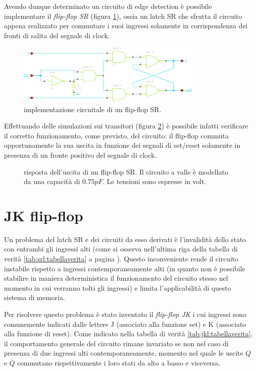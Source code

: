 	\vspace{3mm}
	Avendo dunque determinato un circuito di edge detection è possibile implementare il \textit{flip-flop SR} (figura \ref{fig:srl:flipflop}), ossia un latch SR che sfrutta il circuito appena realizzato per commutare i suoi ingressi solamente in corrispondenza dei fronti di salita del segnale di clock.
	
	\begin{figure}[bht]
		\centering
		\includegraphics[width=9cm]{Immagini/srflipflop}
		\caption{implementazione circuitale di un flip-flop SR.}
		\label{fig:srl:flipflop}
	\end{figure}
	
	Effettuando delle simulazioni sui transitori (figura \ref{fig:srl:flipflop-sim}) è possibile infatti verificare il corretto funzionamento, come previsto, del circuito: il flip-flop commuta opportunamente la sua uscita in funzione dei segnali di set/reset solamente in presenza di un fronte positivo del segnale di clock.
	
	\begin{figure}[bht]
		\centering
		
		\caption{risposta dell'uscita di un flip-flop SR. Il circuito a valle è modellato da una capacità di $0.75pF$. Le tensioni sono espresse in volt.}
		\label{fig:srl:flipflop-sim}
	\end{figure}

\section{JK flip-flop}
	Un problema del latch SR e dei circuiti da esso derivati è l'invalidità dello stato con entrambi gli ingressi alti (come si osserva nell'ultima riga della tabella di verità \ref{tab:srl:tabellaverita} a pagina \pageref{tab:srl:tabellaverita}). Questo inconveniente rende il circuito instabile rispetto a ingressi contemporaneamente alti (in quanto non è possibile stabilire in maniera deterministica il funzionamento del circuito stesso nel momento in cui verranno tolti gli ingressi) e limita l'applicabilità di questo sistema di memoria.
	
	Per risolvere questo problema è stato inventato il \textit{flip-flop JK} i cui ingressi sono comunemente indicati dalle lettere J (associato alla funzione set) e K (associato alla funzione di reset). Come indicato nella tabella di verità \ref{tab:jkl:tabellaverita}, il comportamento generale del circuito rimane invariato se non nel caso di presenza di due ingressi alti contemporaneamente, momento nel quale le uscite $Q$ e $\overline Q$ commutano rispettivamente i loro stati da alto a basso e viceversa. 
	

